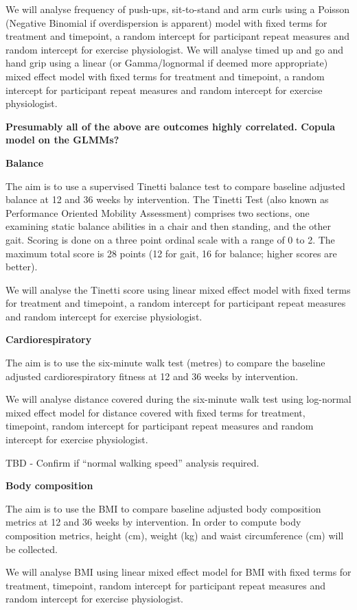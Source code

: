 \documentclass[11pt,parskip=half-]{scrartcl}
\begin{document}
We will analyse frequency of push-ups, sit-to-stand and arm curls using a Poisson (Negative Binomial if overdispersion is apparent) model with fixed terms for treatment and timepoint, a random intercept for participant repeat measures and random intercept for exercise physiologist. We will analyse timed up and go and hand grip using a linear (or Gamma/lognormal if deemed more appropriate) mixed effect model with fixed terms for treatment and timepoint, a random intercept for participant repeat measures and random intercept for exercise physiologist.

\textbf{Presumably all of the above are outcomes highly correlated. Copula model on the GLMMs?}

\textbf{Balance}

The aim is to use a supervised Tinetti balance test to compare baseline adjusted balance at 12 and 36 weeks by intervention. The Tinetti Test (also known as Performance Oriented Mobility Assessment) comprises two sections, one examining static balance abilities in a chair and then standing, and the other gait. Scoring is done on a three point ordinal scale with a range of 0 to 2. The maximum total score is 28 points (12 for gait, 16 for balance; higher scores are better).

We will analyse the Tinetti score using linear mixed effect model with fixed terms for treatment and timepoint, a random intercept for participant repeat measures and random intercept for exercise physiologist.

\textbf{Cardiorespiratory}

The aim is to use the six-minute walk test (metres) to compare the baseline adjusted cardiorespiratory fitness at 12 and 36 weeks by intervention.

We will analyse distance covered during the six-minute walk test using log-normal mixed effect model for distance covered with fixed terms for treatment, timepoint, random intercept for participant repeat measures and random intercept for exercise physiologist.

TBD - Confirm if ``normal walking speed'' analysis required.

\textbf{Body composition}

The aim is to use the BMI to compare baseline adjusted body composition metrics at 12 and 36 weeks by intervention. In order to compute body composition metrics, height (cm), weight (kg) and waist circumference (cm) will be collected.

We will analyse BMI using linear mixed effect model for BMI with fixed terms for treatment, timepoint, random intercept for participant repeat measures and random intercept for exercise physiologist.
\end{document}
